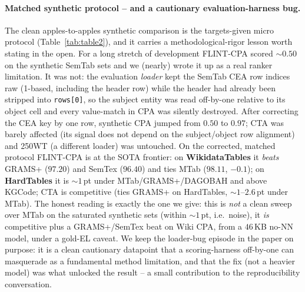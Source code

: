 \paragraph{Matched synthetic protocol -- and a cautionary evaluation-harness bug.}
The clean apples-to-apples synthetic comparison is the targets-given micro protocol
(Table~\ref{tab:table2}), and it carries a methodological-rigor lesson worth stating in
the open. For a long stretch of development FLINT-CPA scored $\sim$$0.50$ on the
synthetic SemTab sets and we (nearly) wrote it up as a real ranker limitation. It was
not: the evaluation \emph{loader} kept the SemTab CEA row indices raw (1-based, including
the header row) while the header had already been stripped into \texttt{rows[0]}, so the
subject entity was read off-by-one relative to its object cell and every value-match in
CPA was silently destroyed. After correcting the CEA key by one row, synthetic CPA jumped
from $\mathbf{0.50}$ to $\mathbf{0.97}$; CTA was barely affected (its signal does not
depend on the subject/object row alignment) and 250WT (a different loader) was untouched.
On the corrected, matched protocol FLINT-CPA is at the SOTA frontier: on
\textbf{WikidataTables} it \emph{beats} GRAMS+ ($97.20$) and SemTex ($96.40$) and ties
MTab ($98.11$, $-0.1$); on \textbf{HardTables} it is $\sim$$1$\,pt under
MTab/GRAMS+/DAGOBAH and above KGCode; CTA is competitive (ties GRAMS+ on HardTables,
$\sim$$1$--$2.6$\,pt under MTab). The honest reading is exactly the one we give: this is
\emph{not} a clean sweep over MTab on the saturated synthetic sets (within $\sim$$1$\,pt,
i.e.\ noise), it \emph{is} competitive plus a GRAMS+/SemTex beat on Wiki CPA, from a
$46$\,KB no-NN model, under a gold-EL caveat. We keep the loader-bug episode in the paper
on purpose: it is a clean cautionary datapoint that a scoring-harness off-by-one can
masquerade as a fundamental method limitation, and that the fix (not a heavier model) was
what unlocked the result -- a small contribution to the reproducibility conversation.

